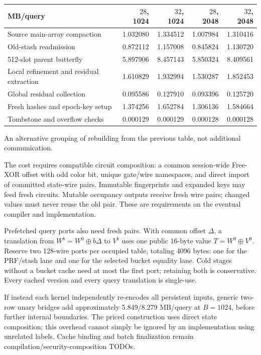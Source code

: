 \documentclass[11pt]{article}
\begin{document}
\begin{center}\footnotesize
\begin{tabular}{lrrrr}\toprule
MB/query & $28$, 1024 & $32$, 1024 & $28$, 2048 & $32$, 2048\\\midrule
Source main-array compaction & 1.032080 & 1.334512 & 1.007984 & 1.310416\\
Old-stash readmission & 0.872112 & 1.157008 & 0.845824 & 1.130720\\
512-slot parent butterfly & 5.897906 & 8.457143 & 5.850324 & 8.409561\\
Local refinement and residual extraction & 1.610829 & 1.932994 & 1.530287 & 1.852453\\
Global residual collection & 0.095586 & 0.127910 & 0.093396 & 0.125720\\
Fresh hashes and epoch-key setup & 1.374256 & 1.652784 & 1.306136 & 1.584664\\
Tombstone and overflow checks & 0.000129 & 0.000129 & 0.000128 & 0.000128\\
\bottomrule\end{tabular}\end{center}
{\footnotesize An alternative grouping of rebuilding from the previous table, not additional communication.\par}

The cost requires compatible circuit composition: a common session-wide
Free-XOR offset with odd color bit, unique gate/wire namespaces, and direct
import of committed state-wire pairs. Immutable fingerprints and expanded
keys may feed fresh circuits. Mutable occupancy outputs receive fresh
wire pairs; changed values must never reuse the old pair. These are
requirements on the eventual compiler and implementation.

Prefetched query ports also need fresh pairs. With common offset $\Delta$,
a translation from $W^b=W^0\oplus b\Delta$ to $V^b$ uses one public
16-byte value $T=W^0\oplus V^0$. Reserve two 128-wire ports per occupied
table, totaling 4096 bytes: one for the PRF/stash lane and one for the
selected bucket equality lane. Cold stages without a bucket cache need
at most the first port; retaining both is conservative. Every cached
version and every query translation is single-use.

If instead each kernel independently re-encodes all persistent inputs,
generic two-row unary bridges add approximately 5.849/8.279 MB/query at
$B=1024$, before further internal boundaries. The priced construction uses
direct state composition; this overhead cannot simply be ignored by an
implementation using unrelated labels. Cache binding and batch finalization
remain compilation/security-composition TODOs.
\end{document}
